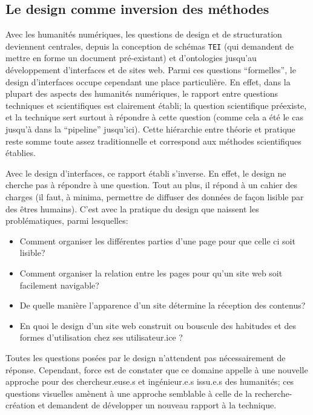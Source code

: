 \documentclass[a4paper, 12pt, twoside]{book}
\newcommand{\tei}{\texttt{TEI}}
\begin{document}
\subsection{Le design comme inversion des méthodes}
Avec les humanités numériques, les questions de design et de structuration deviennent centrales, depuis la conception de schémas \tei{} (qui demandent de mettre en forme un document pré-existant) et d'ontologies jusqu'au développement d'interfaces et de sites web. Parmi ces questions \enquote{formelles}, le design d'interfaces occupe cependant une place particulière. En effet, dans la plupart des aspects des humanités numériques, le rapport entre questions techniques et scientifiques est clairement établi; la question scientifique préexiste, et la technique sert surtout à répondre à cette question (comme cela a été le cas jusqu'à dans la \enquote{pipeline} jusqu'ici). Cette hiérarchie entre théorie et pratique reste somme toute assez traditionnelle et correspond aux méthodes scientifiques établies. 

Avec le design d'interfaces, ce rapport établi s'inverse. En effet, le design ne cherche pas à répondre à une question. Tout au plus, il répond à un cahier des charges (il faut, à minima, permettre de diffuser des données de façon lisible par des êtres humains). C'est avec la pratique du design que naissent les problématiques, parmi lesquelles: 
\begin{itemize}
	\item Comment organiser les différentes parties d'une page pour que celle ci soit lisible? 
	\item Comment organiser la relation entre les pages pour qu'un site web soit facilement navigable? 
	\item De quelle manière l'apparence d'un site détermine la réception des contenus?
	\item En quoi le design d'un site web construit ou bouscule des habitudes et des formes d'utilisation chez ses utilisateur.ice ?
\end{itemize}
Toutes les questions posées par le design n'attendent pas nécessairement de réponse. Cependant, force est de constater que ce domaine appelle à une nouvelle approche pour des chercheur.euse.s et ingénieur.e.s issu.e.s des humanités; ces questions visuelles amènent à une approche semblable à celle de la recherche-création et demandent de développer un nouveau rapport à la technique.
\end{document}
